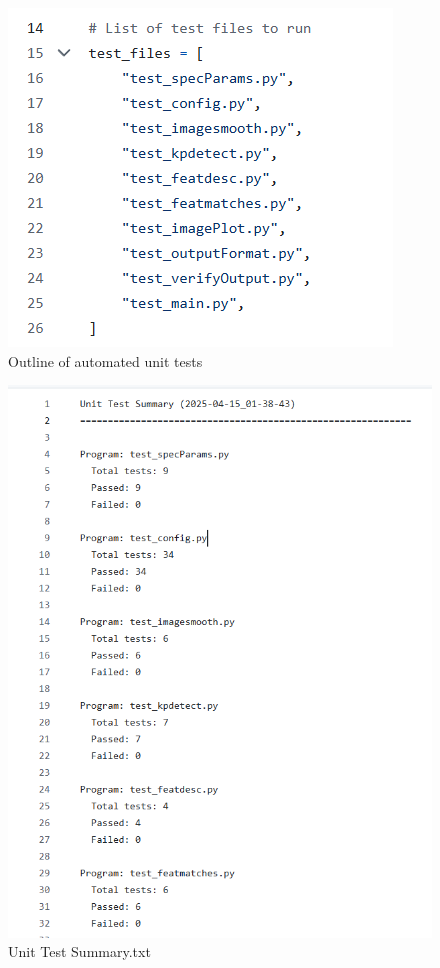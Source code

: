 \documentclass[12pt, titlepage]{article}
\begin{document}
\begin{figure}[h!]
  \centering
  \includegraphics[width=0.65\linewidth]{images/unit_test_names.png}
  \caption{Outline of automated unit tests}
  \label{unit_tests}
\end{figure}

\begin{figure}[h!]
  \centering
  \includegraphics[width=0.8\linewidth]{images/ut_pass_fail.png}
  \caption{Unit Test Summary.txt}
  \label{unit_tests_summary}
\end{figure}
\end{document}
